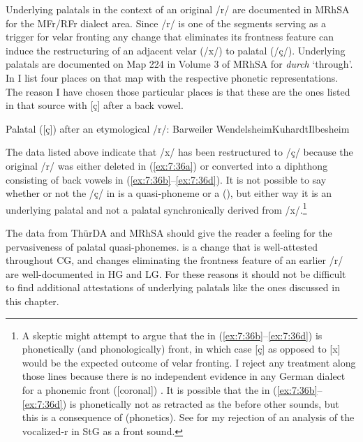 Underlying palatals in the context of an original /r/ are documented in MRhSA for the MFr/RFr dialect area. Since /r/ is one of the segments serving as a trigger for velar fronting any change that eliminates its frontness feature can induce the restructuring of an adjacent velar (/x/) to palatal (/ç/). Underlying palatals are documented on Map 224 in Volume 3 of MRhSA for \textit{durch} ‘through’. In  I list four places on that map with the respective phonetic representations. The reason I have chosen those particular places is that these are the ones listed in that source with [ç] after a back vowel.

\ea\label{ex:7:36}Palatal ([ç]) after an etymological /r/:
\ea\label{ex:7:36a}Barweiler  \tab [d̥uç]
\ex\label{ex:7:36b}Wendelsheim\tab   [d̥ɔəç]
\ex\label{ex:7:36c}Kuhardt\tab   [d̥ɔəç]
\ex\label{ex:7:36d}Ilbesheim\tab   [d̥oəç]
\z 
\z

The data listed above indicate that /x/ has been restructured to /ç/ because the original /r/ was either deleted in (\ref{ex:7:36a}) or converted into a diphthong consisting of back vowels in (\ref{ex:7:36b}--\ref{ex:7:36d}). It is not possible to say whether or not the /ç/ in  is a quasi-phoneme or a  (), but either way it is an underlying palatal and not a palatal synchronically derived from /x/.\footnote{{A skeptic might attempt to argue that the  in (\ref{ex:7:36b}--\ref{ex:7:36d}) is phonetically (and phonologically) front, in which case [ç] as opposed to [x] would be the expected outcome of velar fronting. I reject any treatment along those lines because there is no independent evidence in any German dialect for a phonemic front ([coronal]) . It is possible that the  in (\ref{ex:7:36b}--\ref{ex:7:36d}) is phonetically not as retracted as the  before other sounds, but this is a consequence of  (phonetics). See  for my rejection of an analysis of the vocalized-r in StG as a front sound.}}

The data from ThürDA and MRhSA should give the reader a feeling for the pervasiveness of palatal quasi-phonemes.  is a change that is well-attested throughout CG, and changes eliminating the frontness feature of an earlier /r/ are well-documented in HG and LG. For these reasons it should not be difficult to find additional attestations of underlying palatals like the ones discussed in this chapter.

